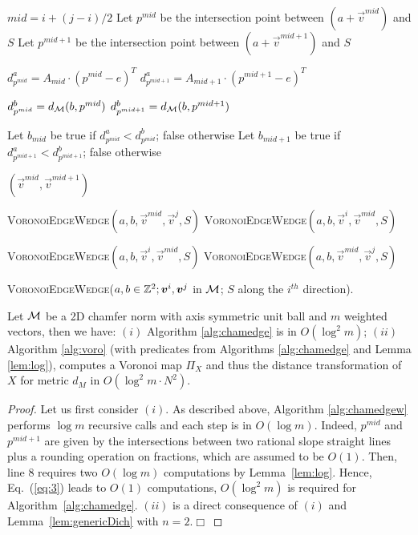 \documentclass{llncs}
\begin{document}
\begin{algorithm}[t]
\footnotesize
{
   $mid  = i + (j-i)/2$\;
   Let $p^{mid}$  be the intersection point between $(a +
   \vec{v}^{mid})$ and $S$\;
  Let $p^{mid+1}$  be the intersection point between $(a +
   \vec{v}^{mid+1})$ and $S$\;


   $d^a_{p^{mid}} = A_{mid}\cdot (p^{mid}-e)^T$\;
   $d^a_{p^{mid+1}} = A_{mid+1}\cdot (p^{mid+1}-e)^T$\;


   $d^b_{p^{mid}} = d_{\mathcal{M}}(b, p^{mid})$\;
   $d^b_{p^{mid+1}} = d_{\mathcal{M}}(b,p^{mid+1})$\;

   Let $b_{mid}$ be true if $d^a_{p^{mid}} < d^b_{p^{mid}}$; false otherwise\;
   Let $b_{mid+1}$ be true if $d^a_{p^{mid+1}} < d^b_{p^{mid+1}}$; false otherwise\;


    { \Return $(\vec{v}^{mid},\vec{v}^{mid+1})$\; }

{
{
  \Return \textsc{VoronoiEdgeWedge}$(a,b,\vec{v}^{mid}, \vec{v}^{j}, S)$\;
}
{
  \Return \textsc{VoronoiEdgeWedge}$(a,b,\vec{v}^{i}, \vec{v}^{mid}, S)$\;
}

}
{
{
  \Return \textsc{VoronoiEdgeWedge}$(a,b,\vec{v}^{i}, \vec{v}^{mid}, S)$\;
}
{
  \Return \textsc{VoronoiEdgeWedge}$(a,b,\vec{v}^{mid}, \vec{v}^{j}, S)$\;
}

}

}
  \caption{\footnotesize
\textsc{VoronoiEdgeWedge}($a,b\in\Z^2; \vec{v}^i,\vec{v}^j$
    in $\mathcal{M}$; $S$ along the $i^{th}$ direction).\label{alg:chamedgew}}
\end{algorithm}
\begin{theorem}
\label{them}
  Let $\mathcal{M}$ be a 2D chamfer norm with axis symmetric unit ball and  $m$ weighted vectors, then we
  have:
  $(i)$ Algorithm     \ref{alg:chamedge} is in  $O(\log^2{m})$;
  $(ii)$ Algorithm \ref{alg:voro} (with predicates from Algorithms
    \ref{alg:chamedge} and Lemma \ref{lem:log}), computes a Voronoi
    map $\Pi_X$ and thus the distance transformation of $X$ for metric
    $d_{M}$ in   $ O( \log^2{m}\cdot N^2)$.
\end{theorem}
\begin{proof}
Let us first consider  $(i)$. As described above, Algorithm
\ref{alg:chamedgew} performs $\log{m}$ recursive calls and each step
is in $O(\log{m})$. Indeed, $p^{mid}$ and $p^{mid+1}$ are given by the
intersections between two rational slope straight lines plus a
rounding operation on fractions, which are assumed to be $O(1)$. Then,
line 8 requires two $O(\log{m})$ computations by
Lemma~\ref{lem:log}. Hence, Eq.~(\ref{eq:3}) leads to $O(1)$
computations, $O(\log^2{m})$ is required for
Algorithm~\ref{alg:chamedge}.   $(ii)$ is a direct
consequence of  $(i)$ and Lemma~\ref{lem:genericDich} with
$n=2$.$\Box$
\end{proof}
\end{document}
